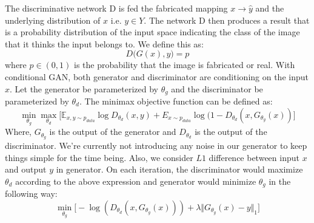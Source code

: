 \documentclass{article} %
\begin{document}
     The discriminative network D is fed the fabricated mapping $x \rightarrow \hat{y}$ and the underlying distribution of $x$ i.e. $y \in Y$. The network D then produces a result that is a probability distribution of the input space indicating the class of the image that it thinks the input belongs to. We define this as:
     $$D\big(G(x),y\big) = p$$
     where $p \in (0,1)$ is the probability that the image is fabricated or real.
    With conditional GAN, both generator and discriminator are conditioning on the input $x$. Let the generator be parameterized by $\theta_g$ and the discriminator be parameterized by $\theta_d$. The minimax objective function can be defined as:
    	\begingroup\makeatletter\def\f@size{7}\check@mathfonts \[
    		\min_{\theta_g}\max_{\theta_d}\Big[\mathbb{E}_{x,y\sim p_{data}} \log D_{\theta_d}(x,y) + E_{x\sim p_{data}} \log(1 - D_{\theta_d}(x, G_{\theta_g}(x))\Big]
    	\] \endgroup
        \normalsize
    Where, $G_{\theta_{g}}$ is the output of the generator and $D_{\theta_d}$ is the output of the discriminator.
    We're currently not introducing any noise in our generator to keep things simple for the time being. Also, we consider $L1$ difference between input $x$ and output $y$ in generator. On each iteration, the discriminator would maximize $\theta_d$ according to the above expression and generator would minimize $\theta_g$ in the following way:
    	\[
    		\min_{\theta_g}\Big[-\log(D_{\theta_d}(x,G_{\theta_g}(x)))+\lambda \Vert G_{\theta_g}(x) - y \Vert_1 \Big]
    	\]
    
\end{document}
